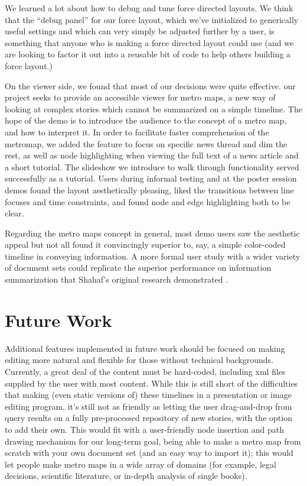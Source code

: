 \documentclass{chi2009}
\begin{document}
We learned a lot about how to debug and tune force directed layouts. We think that the “debug panel” for our force layout, which we’ve initialized to generically useful settings and which can very simply be adjusted further by a user, is something that anyone who is making a force directed layout could use (and we are looking to factor it out into a reusable bit of code to help others building a force layout.)

On the viewer side, we found that most of our decisions were quite effective. our project seeks to provide an accessible viewer for metro maps, a new way of looking at complex stories which cannot be summarized on a simple timeline. The hope of the demo is to introduce the audience to the concept of a metro map, and how to interpret it.  In order to facilitate faster comprehension of the metromap, we added the feature to focus on specific news thread and dim the rest, as well as node highlighting when viewing the full text of a news article and a short tutorial.   The slideshow we introduce to walk through functionality served successfully as a tutorial. Users during informal testing and at the poster session demos found the layout aesthetically pleasing, liked the transitions between line focuses and time constraints, and found node and edge highlighting both to be clear.

Regarding the metro maps concept in general, most demo users saw the aesthetic appeal but not all found it convincingly superior to, say, a simple color-coded timeline in conveying information. A more formal user study with a wider variety of document sets could replicate the superior performance on information summarization that Shahaf’s original research demonstrated \cite{}.

\section{Future Work}

Additional features implemented in future work should be focused on making editing more natural and flexible for those without technical backgrounds. Currently, a great deal of the content must be hard-coded, including xml files supplied by the user with most content. While this is still short of the difficulties that making (even static versions of) these timelines in a presentation or image editing program, it's still not as friendly as letting the user drag-and-drop from query results on a fully pre-processed repository of new stories, with the option to add their own. This would fit with a user-friendly node insertion and path drawing mechanism for our long-term goal, being able to make a metro map from scratch with your own document set (and an easy way to import it); this would let people make metro maps in a wide array of domains (for example, legal decisions, scientific literature, or in-depth analysis of single books).
\end{document}

